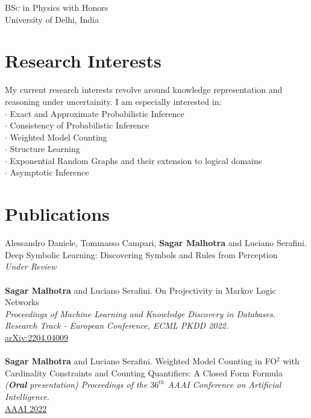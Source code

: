 \documentclass[10pt, a4paper]{article}
\newcommand{\years}[1]{\marginnote{\scriptsize #1}}
\begin{document}
\years{2015-2012}\textsc{BSc} in Physics with Honors\\
University of Delhi, India



\section*{Research Interests}
My current research interests revolve around knowledge representation and reasoning under uncertainity. I am especially interested in:\\

$\cdot$ Exact and Approximate Probabilistic Inference  \\
$\cdot$ Consistency of Probabilistic Inference \\
$\cdot$ Weighted Model Counting\\
$\cdot$ Structure Learning\\
$\cdot$ Exponential Random Graphs and their extension to logical domains\\
$\cdot$ Asymptotic Inference


\section*{Publications}

\noindent

\years{2022} Alessandro Daniele, Tommasso Campari, \textbf{Sagar Malhotra} and Luciano Serafini. \\ Deep Symbolic Learning: Discovering Symbols and Rules from Perception \\ \emph{Under Review} \\ \\
\years{2022}\textbf{Sagar Malhotra} and Luciano Serafini. On Projectivity in Markov Logic Networks \\ \emph{Proceedings of Machine Learning and Knowledge Discovery in Databases. Research Track - European Conference, ECML PKDD 2022.} \\
\href{https://arxiv.org/pdf/2204.04009.pdf}{arXiv:2204.04009} \\ \\ 
\years{2022}\textbf{Sagar Malhotra} and Luciano Serafini. Weighted Model Counting in FO$^2$ with Cardinality Constraints and Counting Quantifiers: A Closed Form Formula \\ \emph{(\textbf{Oral} presentation) Proceedings of the $36^{th}$ AAAI Conference on Artificial Intelligence.}\\ \href{https://ojs.aaai.org/index.php/AAAI/article/view/20525}{AAAI 2022} \\
\end{document}
